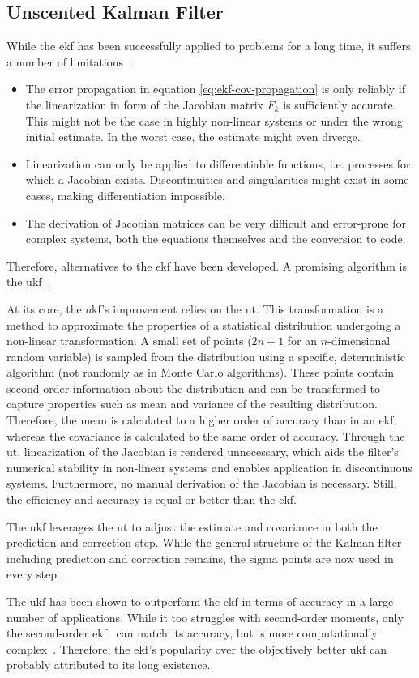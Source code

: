 \subsection{Unscented Kalman Filter}
While the \gls{ekf} has been successfully applied to problems for a long time, it suffers a number of limitations~\cite[p.~402]{Julier.2004}:
\begin{itemize}
\item The error propagation in equation \ref{eq:ekf-cov-propagation} is only reliably if the linearization in form of the Jacobian matrix $F_k$ is sufficiently accurate. This might not be the case in highly non-linear systems or under the wrong initial estimate. In the worst case, the estimate might even diverge.
\item Linearization can only be applied to differentiable functions, i.e. processes for which a Jacobian exists. Discontinuities and singularities might exist in some cases, making differentiation impossible.
\item The derivation of Jacobian matrices can be very difficult and error-prone for complex systems, both the equations themselves and the conversion to code.
\end{itemize}
Therefore, alternatives to the \gls{ekf} have been developed. A promising algorithm is the \gls{ukf}~\cite{SimonJ.Julier.1997}.

At its core, the \gls{ukf}'s improvement relies on the \gls{ut}. This transformation is a method to approximate the properties of a statistical distribution undergoing a non-linear transformation. A small set of points ($2n+1$ for an $n$-dimensional random variable) is sampled from the distribution using a specific, deterministic algorithm (not randomly as in Monte Carlo algorithms). These points contain second-order information about the distribution and can be transformed to capture properties such as mean and variance of the resulting distribution. Therefore, the mean is calculated to a higher order of accuracy than in an \gls{ekf}, whereas the covariance is calculated to the same order of accuracy. Through the \gls{ut}, linearization of the Jacobian is rendered unnecessary, which aids the filter's numerical stability in non-linear systems and enables application in discontinuous systems. Furthermore, no manual derivation of the Jacobian is necessary. Still, the efficiency and accuracy is equal or better than the \gls{ekf}.

The \gls{ukf} leverages the \gls{ut} to adjust the estimate and covariance in both the prediction and correction step. While the general structure of the Kalman filter including prediction and correction remains, the sigma points are now used in every step.

The \gls{ukf} has been shown to outperform the \gls{ekf} in terms of accuracy in a large number of applications. While it too struggles with second-order moments, only the second-order \gls{ekf}~\cite{M.Roth.2011} can match its accuracy, but is more computationally complex~\cite{Gustafsson.2012}. Therefore, the \gls{ekf}'s popularity over the objectively better \gls{ukf} can probably attributed to its long existence.
